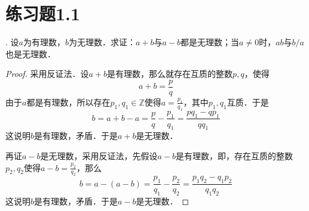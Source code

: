 


\section*{练习题1.1}
. 设$a$为有理数，$b$为无理数．求证：$a+b$与$a-b$都是无理数；当$a\neq 0$时，$ab$与$b/a$也是无理数．
\begin{proof}
采用反证法．设$a+b$是有理数，那么就存在互质的整数$p,q$，使得
\begin{equation}
    a+b = \frac{p}{q}
\end{equation}
由于$a$都是有理数，所以存在$p_1,q_1 \in \mathbb{Z}$使得$a = \displaystyle \frac{p_1}{q_1}$，其中$p_1,q_1$互质．于是
\begin{equation}
    b = a+b - a = \frac{p}{q} - \frac{p_1}{q_1} = \frac{p q_1 - q p_1}{q q_1}
\end{equation}
这说明$b$是有理数，矛盾．于是$a+b$是无理数．

\noindent 再证$a-b$是无理数，采用反证法，先假设$a-b$是有理数，即，存在互质的整数$p_2,q_2$使得$\displaystyle a-b=\frac{p_2}{q_2}$，那么
\begin{equation}
    b = a - (a-b) = \frac{p_1}{q_1} - \frac{p_2}{q_2} = \frac{p_1 q_2 - q_1 p_2}{q_1 q_2}
\end{equation}
这说明$b$是有理数，矛盾．于是$a-b$是无理数．
\end{proof}

